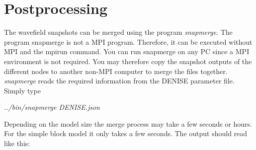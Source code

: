\section{Postprocessing}  
The wavefield snapshots can be merged using the program \textit{snapmerge}. The program snapmerge is not a MPI program. Therefore, it can be executed without MPI and the mpirun command. You can run snapmerge on any PC since a MPI environment is not required. You may therefore copy the snapshot outputs of the different nodes to another non-MPI computer to merge the files together. \textit{snapmerge} reads the required information from the DENISE parameter file. Simply type
\newline

\textit{../bin/snapmerge DENISE.json  }
\newline


Depending on the model size the merge process may take a few seconds or hours. For the simple block model it only takes a few seconds. The output should read like this:
{\color{blue}{\begin{verbatim}
 pressure (files: ./snap/test.bin.p.??? ).

 writing merged snapshot file to  ./snap/test.bin.p
 Opening snapshot files: ./snap/test.bin.p.???  ... finished.
 Copying... ... finished.
 Use
 xmovie n1=100 n2=100 < ./snap/test.bin.p loop=1 label1=Y label2=X title=%g
 to play movie.
\end{verbatim}}} 
